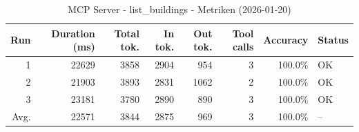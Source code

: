 \begin{table}[ht]
\centering
\small
\caption{MCP Server - list\_buildings - Metriken (2026-01-20)}
\label{tab:mcp\_list\_buildings\_metrics\_2026-01-20}
\begin{tabular}{r r r r r r r l}
\hline
Run & Duration (ms) & Total tok. & In tok. & Out tok. & Tool calls & Accuracy & Status \\
\hline
1 & 22629 & 3858 & 2904 & 954 & 3 & 100.0\% & OK \\
2 & 21903 & 3893 & 2831 & 1062 & 2 & 100.0\% & OK \\
3 & 23181 & 3780 & 2890 & 890 & 3 & 100.0\% & OK \\
\hline
Avg. & 22571 & 3844 & 2875 & 969 & 3 & 100.0\% & -- \\
\hline
\end{tabular}
\end{table}
